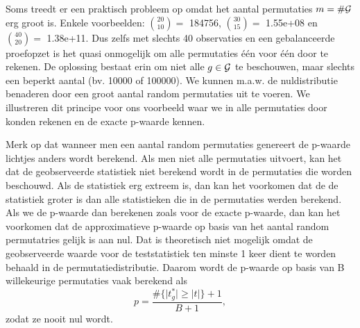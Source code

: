 \documentclass[12pt,dutch,coursenotes]{book}
\theoremstyle{definition}
\theoremstyle{definition}
\theoremstyle{definition}
\theoremstyle{remark}
\begin{document}
Soms treedt er een praktisch probleem op omdat het aantal permutaties
\(m=\#{\cal{G}}\) erg groot is. Enkele voorbeelden: \(\binom{20}{10}=\)
184756, \(\binom{30}{15}=\) 1.55e+08 en \(\binom{40}{20}=\) 1.38e+11.
Dus zelfs met slechts 40 observaties en een gebalanceerde proefopzet is
het quasi onmogelijk om alle permutaties één voor één door te rekenen.
De oplossing bestaat erin om niet alle \(g \in {\cal{G}}\) te
beschouwen, maar slechts een beperkt aantal (bv. 10000 of 100000). We
kunnen m.a.w. de nuldistributie benaderen door een groot aantal random
permutaties uit te voeren. We illustreren dit principe voor ons
voorbeeld waar we in alle permutaties door konden rekenen en de exacte
p-waarde kennen.

Merk op dat wanneer men een aantal random permutaties genereert de
p-waarde lichtjes anders wordt berekend. Als men niet alle permutaties
uitvoert, kan het dat de geobserveerde statistiek niet berekend wordt in
de permutaties die worden beschouwd. Als de statistiek erg extreem is,
dan kan het voorkomen dat de de statistiek groter is dan alle
statistieken die in de permutaties werden berekend. Als we de p-waarde
dan berekenen zoals voor de exacte p-waarde, dan kan het voorkomen dat
de approximatieve p-waarde op basis van het aantal random permutatries
gelijk is aan nul. Dat is theoretisch niet mogelijk omdat de
geobserveerde waarde voor de teststatistiek ten minste 1 keer dient te
worden behaald in de permutatiedistributie. Daarom wordt de p-waarde op
basis van B willekeurige permutaties vaak berekend als
\[p=\frac{\#\{\vert t^*_g\vert \geq \vert t \vert \}+1}{B+1},\] zodat ze
nooit nul wordt.
\end{document}

